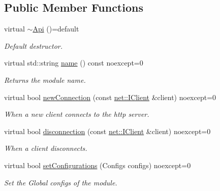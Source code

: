 \subsection*{Public Member Functions}
\begin{DoxyCompactItemize}
\item 
\mbox{\label{structmodule_1_1Api_a6c8d118958a709fc02b7253d39286327}} 
virtual \hyperlink{structmodule_1_1Api_a6c8d118958a709fc02b7253d39286327}{$\sim$\+Api} ()=default
\begin{DoxyCompactList}\small\item\em Default destructor. \end{DoxyCompactList}\item 
\mbox{\label{structmodule_1_1Api_a183b56d5e35e77fa76d02ab27f55f742}} 
virtual std\+::string \hyperlink{structmodule_1_1Api_a183b56d5e35e77fa76d02ab27f55f742}{name} () const noexcept=0
\begin{DoxyCompactList}\small\item\em Returns the module name. \end{DoxyCompactList}\item 
virtual bool \hyperlink{structmodule_1_1Api_aa83ddc92765200dd65f915498175c2be}{new\+Connection} (const \hyperlink{structnet_1_1IClient}{net\+::\+I\+Client} \&client) noexcept=0
\begin{DoxyCompactList}\small\item\em When a new client connects to the http server. \end{DoxyCompactList}\item 
virtual bool \hyperlink{structmodule_1_1Api_a8aa98bd4094fb13916e100509a948763}{disconnection} (const \hyperlink{structnet_1_1IClient}{net\+::\+I\+Client} \&client) noexcept=0
\begin{DoxyCompactList}\small\item\em When a client disconnects. \end{DoxyCompactList}\item 
\mbox{\label{structmodule_1_1Api_a93b6a1380a8f0448ff5d06af8dbd03ca}} 
virtual bool \hyperlink{structmodule_1_1Api_a93b6a1380a8f0448ff5d06af8dbd03ca}{set\+Configurations} (Configs configs) noexcept=0
\begin{DoxyCompactList}\small\item\em Set the Global configs of the module. \end{DoxyCompactList}\item 

\end{DoxyCompactItemize}
